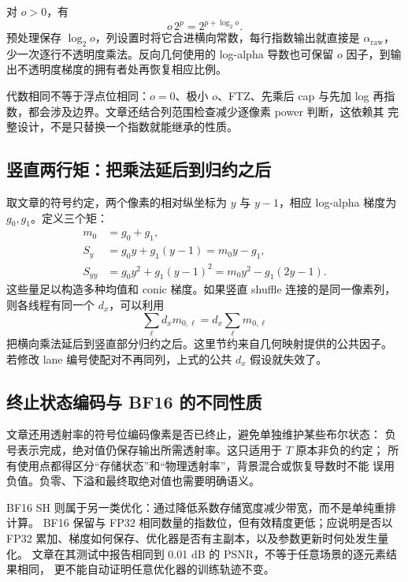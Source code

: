 对 $o>0$，有
\begin{equation}
 o\,2^p=2^{p+\log_2o}.
\end{equation}
预处理保存 $\log_2o$，列设置时将它合进横向常数，每行指数输出就直接是
$\alpha_{\mathrm{raw}}$，少一次逐行不透明度乘法。反向几何使用的 log-alpha
导数也可保留 $o$ 因子，到输出不透明度梯度的拥有者处再恢复相应比例。

代数相同不等于浮点位相同：$o=0$、极小 $o$、FTZ、先乘后 cap 与先加 log
再指数，都会涉及边界。文章还结合列范围检查减少逐像素 power 判断，这依赖其
完整设计，不是只替换一个指数就能继承的性质。

\subsection{竖直两行矩：把乘法延后到归约之后}

取文章的符号约定，两个像素的相对纵坐标为 $y$ 与 $y-1$，相应 log-alpha
梯度为 $g_0,g_1$。定义三个矩：
\begin{align}
 m_0&=g_0+g_1,\\
 S_y&=g_0y+g_1(y-1)=m_0y-g_1,\\
 S_{yy}&=g_0y^2+g_1(y-1)^2=m_0y^2-g_1(2y-1).
\end{align}
这些量足以构造多种均值和 conic 梯度。如果竖直 shuffle 连接的是同一像素列，
则各线程有同一个 $d_x$，可以利用
\begin{equation}
 \sum_\ell d_x m_{0,\ell}=d_x\sum_\ell m_{0,\ell}
\end{equation}
把横向乘法延后到竖直部分归约之后。这里节约来自几何映射提供的公共因子。
若修改 lane 编号使配对不再同列，上式的公共 $d_x$ 假设就失效了。

\subsection{终止状态编码与 BF16 的不同性质}

文章还用透射率的符号位编码像素是否已终止，避免单独维护某些布尔状态：
负号表示完成，绝对值仍保存输出所需透射率。这只适用于 $T$ 原本非负的约定；
所有使用点都得区分``存储状态''和``物理透射率''，背景混合或恢复导数时不能
误用负值。负零、下溢和最终取绝对值也需要明确语义。

BF16 SH 则属于另一类优化：通过降低系数存储宽度减少带宽，而不是单纯重排计算。
BF16 保留与 FP32 相同数量的指数位，但有效精度更低；应说明是否以 FP32
累加、梯度如何保存、优化器是否有主副本，以及参数更新时何处发生量化。
文章在其测试中报告相同到 0.01 dB 的 PSNR，不等于任意场景的逐元素结果相同，
更不能自动证明任意优化器的训练轨迹不变。

